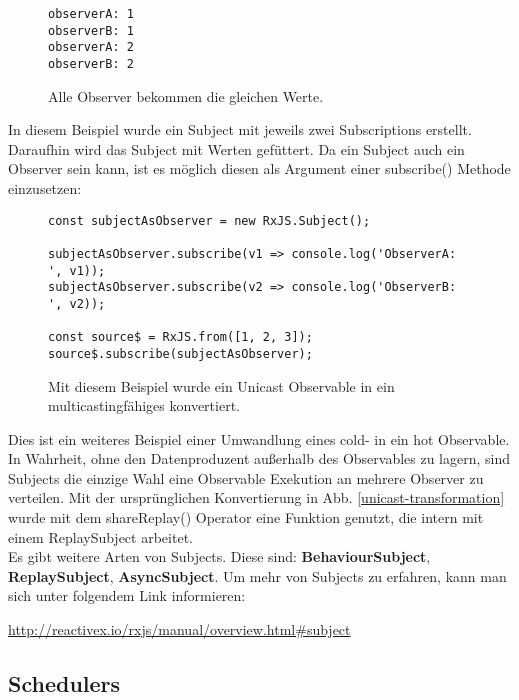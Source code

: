 \begin{figure}[H]
\begin{lstlisting}
observerA: 1
observerB: 1
observerA: 2
observerB: 2
\end{lstlisting}
\caption{Alle Observer bekommen die gleichen Werte.}
\end{figure}

\noindent
In diesem Beispiel wurde ein Subject mit jeweils zwei Subscriptions erstellt. Daraufhin wird das Subject mit Werten \glqq gefüttert\grqq. Da ein Subject auch ein Observer sein kann, ist es möglich diesen als Argument einer subscribe() Methode einzusetzen:

\begin{figure}[H]
\begin{lstlisting}[basicstyle=\small]
const subjectAsObserver = new RxJS.Subject();

subjectAsObserver.subscribe(v1 => console.log('ObserverA: ', v1));
subjectAsObserver.subscribe(v2 => console.log('ObserverB: ', v2));

const source$ = RxJS.from([1, 2, 3]);
source$.subscribe(subjectAsObserver);
\end{lstlisting}
\caption{Mit diesem Beispiel wurde ein Unicast Observable in ein multicastingfähiges konvertiert.}
\end{figure}


\noindent
Dies ist ein weiteres Beispiel einer Umwandlung eines cold- in ein hot Observable. In Wahrheit, ohne den Datenproduzent außerhalb des Observables zu lagern, sind Subjects die einzige Wahl eine Observable Exekution an mehrere Observer zu verteilen. Mit der ursprünglichen Konvertierung in Abb. \ref{unicast-transformation} wurde mit dem shareReplay() Operator eine Funktion genutzt, die intern mit einem ReplaySubject arbeitet.\\

\noindent
Es gibt weitere Arten von Subjects. Diese sind: \textbf{BehaviourSubject}, \textbf{ReplaySubject}, \textbf{AsyncSubject}. Um mehr von Subjects zu erfahren, kann man sich unter folgendem Link informieren:

\begin{center}
    \url{http://reactivex.io/rxjs/manual/overview.html#subject}
\end{center}

\subsection{Schedulers}

